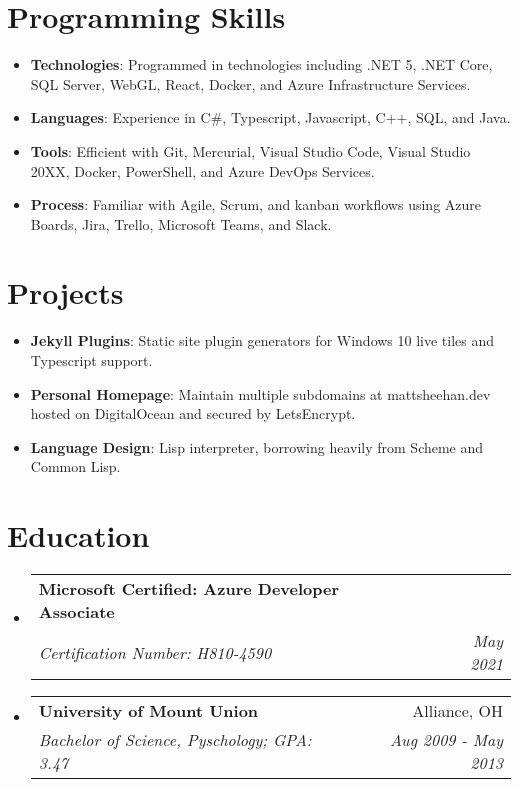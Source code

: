\documentclass[letterpaper,11pt]{article}
\makeatletter
\newcommand{\resumeItem}[2]{
  \item\small{
    \textbf{#1}{: #2 \vspace{-2pt}}
  }
}
\newcommand{\resumeSubheading}[4]{
  \vspace{-1pt}\item
    \begin{tabular*}{0.97\textwidth}[t]{l@{\extracolsep{\fill}}r}
      \textbf{#1} & #2 \\
      \textit{\small#3} & \textit{\small #4} \\
    \end{tabular*}\vspace{-5pt}
}
\newcommand{\resumeSubItem}[2]{\resumeItem{#1}{#2}\vspace{-4pt}}
\newcommand{\resumeSubHeadingListStart}{\begin{itemize}[leftmargin=*]}
\newcommand{\resumeSubHeadingListEnd}{\end{itemize}}
\makeatother
\begin{document}
\section{Programming Skills}
    \resumeSubHeadingListStart
        \resumeSubItem{Technologies}
          {Programmed in technologies including .NET 5, .NET Core, SQL Server, WebGL, React, Docker, and Azure Infrastructure Services.}
        \resumeSubItem{Languages}
          {Experience in C\#, Typescript, Javascript, C++, SQL, and Java.}
        \resumeSubItem{Tools}
          {Efficient with Git, Mercurial, Visual Studio Code, Visual Studio 20XX, Docker, PowerShell, and Azure DevOps Services.}
        \resumeSubItem{Process}
          {Familiar with Agile, Scrum, and kanban workflows using Azure Boards, Jira, Trello, Microsoft Teams, and Slack. }
    \resumeSubHeadingListEnd


\section{Projects}
  \resumeSubHeadingListStart
    \resumeSubItem{Jekyll Plugins}
      {Static site plugin generators for Windows 10 live tiles and Typescript support.}
    \resumeSubItem{Personal Homepage}
      {Maintain multiple subdomains at mattsheehan.dev hosted on DigitalOcean and secured by LetsEncrypt.}
    \resumeSubItem{Language Design}
      {Lisp interpreter, borrowing heavily from Scheme and Common Lisp.}
  \resumeSubHeadingListEnd


\section{Education}
  \resumeSubHeadingListStart
    \resumeSubheading
      {Microsoft Certified: Azure Developer Associate}{}
      {Certification Number: H810-4590}{May 2021}
    \resumeSubheading
      {University of Mount Union}{Alliance, OH}
      {Bachelor of Science, Pyschology;  GPA: 3.47}{Aug 2009 - May 2013}
  \resumeSubHeadingListEnd


%
%

\end{document}
